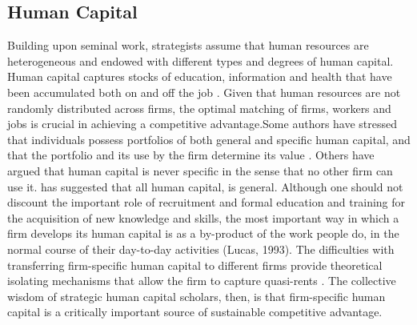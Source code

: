 \documentclass[12pt,letterpaper]{article}
\begin{document}
\subsection{Human Capital}
Building upon \cite{Becker1962} seminal work, strategists assume that human resources are heterogeneous and endowed with different types and degrees of human capital. Human capital captures stocks of education, information and health that have been accumulated both on and off the job \citep{Becker1962}. Given that human resources are not randomly distributed across firms, the optimal matching of firms, workers and jobs is crucial in achieving a competitive advantage.Some authors have stressed that individuals possess portfolios of both general and specific human capital, and that the portfolio and its use by the firm determine its value \citep{Campbell2012}. Others have argued that human capital is never specific in the sense that no other firm can use it. \cite{Lazear2009} has suggested that all human capital, is general. Although one should not discount the important role of recruitment and formal education and training for the acquisition of new knowledge and skills, the most
important way in which a firm develops its human capital is as a by-product of the work people do, in the normal course of their day-to-day activities (Lucas, 1993). The difficulties with transferring firm-specific human capital to different firms provide theoretical isolating mechanisms that allow the firm to capture quasi-rents \citep{Barney1991, Campbell2012}. The collective wisdom of strategic human capital
scholars, then, is that firm-specific human capital is a critically important source of sustainable competitive advantage.
\end{document}
